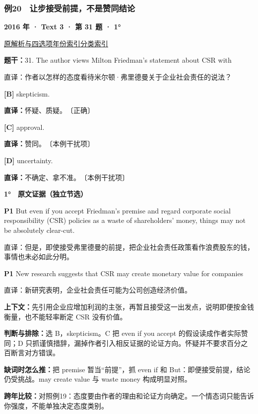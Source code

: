 \documentclass[11pt,a4paper]{article}
\begin{document}
\subsubsection{例20　让步接受前提，不是赞同结论}\label{case-2016-T3-Q31}
\noindent\textbf{2016 年 · Text 3 · 第 31 题 · 1°}\par\noindent \href{https://zj139.github.io/math-notes/english/b6f08ab4d489c8194307c00d/\#q31}{原解析与四选项}\quad \hyperref[idx-2016-T3-Q31]{年份索引}\quad \hyperref[class-R10]{分类索引}\par\smallskip
\noindent\textbf{题干：}31. The author views Milton Friedman's statement about CSR with\par
直译：作者以怎样的态度看待米尔顿·弗里德曼关于企业社会责任的说法？\par
{}\noindent\textbf{[B]} skepticism.\par\nopagebreak
\noindent\textbf{直译：}怀疑、质疑。　〔正确〕\par
{}\noindent\textbf{[C]} approval.\par\nopagebreak
\noindent\textbf{直译：}赞同。　〔本例干扰项〕\par
{}\noindent\textbf{[D]} uncertainty.\par\nopagebreak
\noindent\textbf{直译：}不确定、拿不准。　〔本例干扰项〕\par
\begin{evidence}\textbf{1°　原文证据（独立节选）}\par
\textbf{P1} But even if you accept Friedman's premise and regard corporate social responsibility (CSR) policies as a waste of shareholders’ money, things may not be absolutely clear-cut.\par 直译：但是，即使接受弗里德曼的前提，把企业社会责任政策看作浪费股东的钱，事情也未必如此分明。\par
\textbf{P1} New research suggests that CSR may create monetary value for companies\par 直译：新研究表明，企业社会责任可能为公司创造经济价值。\par
\end{evidence}
\noindent\textbf{上下文：}先引用企业应增加利润的主张，再暂且接受这一出发点，说明即便按金钱衡量，也不能轻率断定 CSR 没有价值。\par
\noindent\textbf{判断与排除：}选 B，skepticism。C 把 even if you accept 的假设读成作者实际赞同；D 只抓谨慎措辞，漏掉作者引入相反证据的论证方向。怀疑并不要求百分之百断言对方错误。\par
\noindent\textbf{缺词时怎么推：}把 premise 暂当“前提”，抓 even if 和 But：即便接受前提，结论仍受挑战。may create value 与 waste money 构成明显对照。\par
\noindent\textbf{跨年比较：}对照例19：态度要由作者的理由和论证方向确定。一个情态词只能告诉你强度，不能单独决定态度类别。\par
\clearpage
\end{document}
